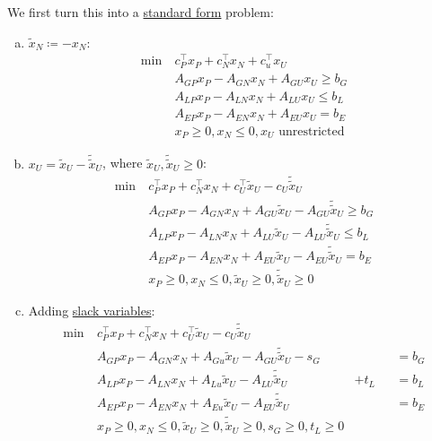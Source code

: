 We first turn this into a \hyperref[def:standard-form]{standard form} problem:
\begin{enumerate}[(a)]
	\item \(\widetilde{x}_N \coloneqq -x_N\):
	      \[
		      \begin{aligned}
			      \min~ & c^{\top}_P x_P + c^{\top}_N x_N + c^{\top}_u x_U \\
			            & A_{GP}x_P -A_{GN}x_N + A_{GU}x_U\geq b_G         \\
			            & A_{LP}x_P -A_{LN}x_N + A_{LU}x_U \leq b_L        \\
			            & A_{EP}x_P -A_{EN}x_N + A_{EU}x_U = b_E           \\
			            & x_P\geq 0, x_N \leq 0, x_U \text{ unrestricted}
		      \end{aligned}
	      \]
	\item \(x_U = \widetilde{x}_U - \widetilde{\widetilde{x}}_U\), where \(\widetilde{x}_U, \widetilde{\widetilde{x}}_U \geq 0\):
	      \[
		      \begin{aligned}
			      \min~ & c^{\top}_P x_P + c^{\top}_N x_N + c^{\top}_U \widetilde{x}_U - c_U \widetilde{\widetilde{x}}_U \\
			            & A_{GP}x_P -A_{GN}x_N + A_{GU}\widetilde{x}_U -A_{GU}\widetilde{\widetilde{x}}_U \geq b_G       \\
			            & A_{LP}x_P -A_{LN}x_N + A_{LU}\widetilde{x}_U -A_{LU}\widetilde{\widetilde{x}}_U\leq b_L        \\
			            & A_{EP}x_P -A_{EN}x_N + A_{EU}\widetilde{x}_U -A_{EU}\widetilde{\widetilde{x}}_U= b_E           \\
			            & x_P\geq 0, x_N \leq 0, \widetilde{x}_U \geq 0, \widetilde{\widetilde{x}}_U\geq 0
		      \end{aligned}
	      \]
	\item Adding \hyperref[def:slack-variable]{slack variables}:
	      \[
		      \begin{alignedat}{3}
			      \min~ & c^{\top}_P x_P + c^{\top}_N x_N + c^{\top}_U \widetilde{x}_U - c_U \widetilde{\widetilde{x}}_U    \\
			      & A_{GP}x_P -A_{GN}x_N + A_{Gu}\widetilde{x}_U -A_{GU}\widetilde{\widetilde{x}}_U - s_G &       && = b_G \\
			      & A_{LP}x_P -A_{LN}x_N + A_{Lu}\widetilde{x}_U -A_{LU}\widetilde{\widetilde{x}}_U       & + t_L && = b_L \\
			      & A_{EP}x_P -A_{EN}x_N + A_{Eu}\widetilde{x}_U -A_{EU}\widetilde{\widetilde{x}}_U       &       && = b_E \\
			      & x_P\geq 0, x_N \leq 0, \widetilde{x}_U \geq 0, \widetilde{\widetilde{x}}_U\geq 0, s_G\geq 0, t_L \geq 0
		      \end{alignedat}
	      \]
\end{enumerate}

